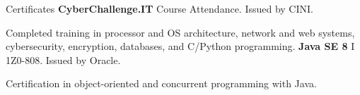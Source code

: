 \vspace*{-1em}
\begin{rubric}{Certificates}
    \entry*[2021] \textbf{CyberChallenge.IT} Course Attendance. Issued by CINI.

    Completed training in processor and OS architecture, network and web systems, cybersecurity, encryption, databases, and C/Python programming.
    \entry*[2018] \textbf{Java SE 8} I 1Z0-808. Issued by Oracle.

    Certification in object-oriented and concurrent programming with Java.
\end{rubric}